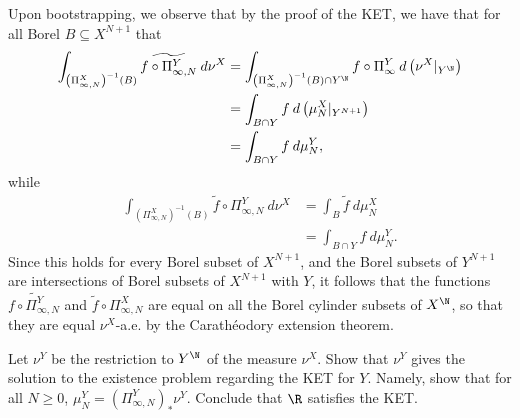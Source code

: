 \documentclass[10pt]{mypackage}
\begin{document}
\begin{solution}
  Upon bootstrapping, we observe that by the proof of the KET, we have that for all Borel $B\subseteq X^{N+1}$ that
  \begin{align*}
    \int_{\left( \Pi^X_{\infty,N} \right)^{-1}\left( B \right)}^{} \widetilde{f\circ \Pi^Y_{\infty,N}}\:d\nu^X &= \int_{\left( \Pi^X_{\infty,N} \right)^{-1}\left(B\right)\cap Y^{\N}}^{} f\circ \Pi^Y_{\infty}\:d\left( \nu^X|_{Y^{\N}} \right)\\
                  &= \int_{B\cap Y}^{} f\:d\left( \mu^X_N|_{Y^{N+1}} \right)\\
                  &= \int_{B\cap Y}^{} f\:d\mu^Y_N,
  \end{align*}
  while
  \begin{align*}
    \int_{\left( \Pi^X_{\infty,N} \right)^{-1}\left( B \right)}^{} \widetilde{f}\circ \Pi^{Y}_{\infty,N}\:d\nu^X &= \int_{B}^{} \widetilde{f}\:d\mu^X_N\\
                                 &= \int_{B\cap Y}^{} f\:d\mu^Y_N.
  \end{align*}
  Since this holds for every Borel subset of $X^{N+1}$, and the Borel subsets of $Y^{N+1}$ are intersections of Borel subsets of $X^{N+1}$ with $Y$, it follows that the functions $ \widetilde{f\circ \Pi^Y_{\infty,N}} $ and $ \widetilde{f}\circ \Pi^{X}_{\infty,N} $ are equal on all the Borel cylinder subsets of $X^{\N}$, so that they are equal $\nu^X$-a.e. by the Carathéodory extension theorem.
\end{solution}
\begin{problem}[Problem IV.16]
  Let $\nu^Y$ be the restriction to $Y^{\N}$ of the measure $\nu^X$. Show that $\nu^Y$ gives the solution to the existence problem regarding the KET for $Y$. Namely, show that for all $N\geq 0$, $\mu^Y_N = \left( \Pi^Y_{\infty,N} \right)_{\ast}\nu^Y$. Conclude that $\R$ satisfies the KET.
\end{problem}
\end{document}
